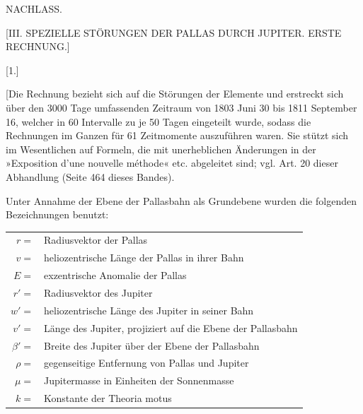\clearpage
{}
\begin{center}
{\Large NACHLASS.\par}
\bigskip
{\large [III. SPEZIELLE STÖRUNGEN DER PALLAS DURCH JUPITER. ERSTE RECHNUNG.]\par}
\end{center}
\par{}\bigskip
{}
\begin{center}[1.]\end{center}
\begingroup
\makeatletter\tagsleft@true\let\veqno\@@leqno\makeatother
\setlength{\lineskip}{4pt}\setlength{\lineskiplimit}{4pt}
\noindent\hspace*{\parindent}[Die Rechnung bezieht sich auf die Störungen der Elemente und erstreckt sich über den 3000 Tage umfassenden Zeitraum von 1803 Juni 30 bis 1811 September 16, welcher in 60 Intervalle zu je 50 Tagen eingeteilt wurde, sodass die Rechnungen im Ganzen für 61 Zeitmomente auszuführen waren. Sie stützt sich im Wesentlichen auf Formeln, die mit unerheblichen Änderungen in der »Exposition d’une nouvelle méthode« etc. abgeleitet sind; vgl. Art. 20 dieser Abhandlung (Seite 464 dieses Bandes).
\par
Unter Annahme der Ebene der Pallasbahn als Grundebene wurden die folgenden Bezeichnungen benutzt:
\begin{center}
\begin{tabular}{@{}r@{\ }p{.86\linewidth}@{}}
\(r={}\)&Radiusvektor der Pallas\\
\(v={}\)&heliozentrische Länge der Pallas in ihrer Bahn\\
\(E={}\)&exzentrische Anomalie der Pallas\\
\(r'={}\)&Radiusvektor des Jupiter\\
\(w'={}\)&heliozentrische Länge des Jupiter in seiner Bahn\\
\(v'={}\)&Länge des Jupiter, projiziert auf die Ebene der Pallasbahn\\
\(\beta'={}\)&Breite des Jupiter über der Ebene der Pallasbahn\\
\(\rho={}\)&gegenseitige Entfernung von Pallas und Jupiter\\
\(\mu={}\)&Jupitermasse in Einheiten der Sonnenmasse\\
\(k={}\)&Konstante der Theoria motus
\end{tabular}
\end{center}
